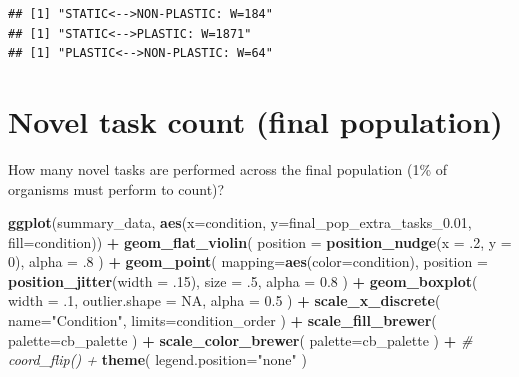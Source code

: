 \documentclass[]{book}
\newenvironment{Shaded}{\begin{snugshade}}{\end{snugshade}}
\newcommand{\CommentTok}[1]{\textcolor[rgb]{0.56,0.35,0.01}{\textit{#1}}}
\newcommand{\DataTypeTok}[1]{\textcolor[rgb]{0.13,0.29,0.53}{#1}}
\newcommand{\DecValTok}[1]{\textcolor[rgb]{0.00,0.00,0.81}{#1}}
\newcommand{\FloatTok}[1]{\textcolor[rgb]{0.00,0.00,0.81}{#1}}
\newcommand{\KeywordTok}[1]{\textcolor[rgb]{0.13,0.29,0.53}{\textbf{#1}}}
\newcommand{\NormalTok}[1]{#1}
\newcommand{\OperatorTok}[1]{\textcolor[rgb]{0.81,0.36,0.00}{\textbf{#1}}}
\newcommand{\OtherTok}[1]{\textcolor[rgb]{0.56,0.35,0.01}{#1}}
\newcommand{\StringTok}[1]{\textcolor[rgb]{0.31,0.60,0.02}{#1}}
\begin{document}
\begin{verbatim}
## [1] "STATIC<-->NON-PLASTIC: W=184"
## [1] "STATIC<-->PLASTIC: W=1871"
## [1] "PLASTIC<-->NON-PLASTIC: W=64"
\end{verbatim}

\hypertarget{novel-task-count-final-population}{%
\section{Novel task count (final population)}\label{novel-task-count-final-population}}

How many novel tasks are performed across the final population (1\% of organisms must perform to count)?

\begin{Shaded}
\begin{Highlighting}[]
\KeywordTok{ggplot}\NormalTok{(summary_data, }\KeywordTok{aes}\NormalTok{(}\DataTypeTok{x=}\NormalTok{condition, }\DataTypeTok{y=}\NormalTok{final_pop_extra_tasks_}\FloatTok{0.01}\NormalTok{, }\DataTypeTok{fill=}\NormalTok{condition)) }\OperatorTok{+}
\StringTok{  }\KeywordTok{geom_flat_violin}\NormalTok{(}
    \DataTypeTok{position =} \KeywordTok{position_nudge}\NormalTok{(}\DataTypeTok{x =} \FloatTok{.2}\NormalTok{, }\DataTypeTok{y =} \DecValTok{0}\NormalTok{),}
    \DataTypeTok{alpha =} \FloatTok{.8}
\NormalTok{  ) }\OperatorTok{+}
\StringTok{  }\KeywordTok{geom_point}\NormalTok{(}
    \DataTypeTok{mapping=}\KeywordTok{aes}\NormalTok{(}\DataTypeTok{color=}\NormalTok{condition),}
    \DataTypeTok{position =} \KeywordTok{position_jitter}\NormalTok{(}\DataTypeTok{width =} \FloatTok{.15}\NormalTok{),}
    \DataTypeTok{size =} \FloatTok{.5}\NormalTok{,}
    \DataTypeTok{alpha =} \FloatTok{0.8}
\NormalTok{  ) }\OperatorTok{+}
\StringTok{  }\KeywordTok{geom_boxplot}\NormalTok{(}
    \DataTypeTok{width =} \FloatTok{.1}\NormalTok{,}
    \DataTypeTok{outlier.shape =} \OtherTok{NA}\NormalTok{,}
    \DataTypeTok{alpha =} \FloatTok{0.5}
\NormalTok{  ) }\OperatorTok{+}
\StringTok{  }\KeywordTok{scale_x_discrete}\NormalTok{(}
    \DataTypeTok{name=}\StringTok{"Condition"}\NormalTok{,}
    \DataTypeTok{limits=}\NormalTok{condition_order}
\NormalTok{  ) }\OperatorTok{+}
\StringTok{  }\KeywordTok{scale_fill_brewer}\NormalTok{(}
    \DataTypeTok{palette=}\NormalTok{cb_palette}
\NormalTok{  ) }\OperatorTok{+}
\StringTok{  }\KeywordTok{scale_color_brewer}\NormalTok{(}
    \DataTypeTok{palette=}\NormalTok{cb_palette}
\NormalTok{  ) }\OperatorTok{+}
\StringTok{  }\CommentTok{# coord_flip() +}
\StringTok{  }\KeywordTok{theme}\NormalTok{(}
    \DataTypeTok{legend.position=}\StringTok{"none"}
\NormalTok{  )}
\end{Highlighting}
\end{Shaded}
\end{document}
